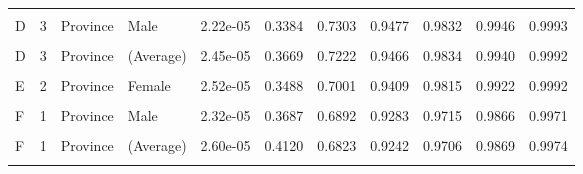 \documentclass[
]{report}
\begin{document}
\begin{table}[!h]
\begin{tabular}[t]{llllrrrrrrr}
\cellcolor{gray!6}{C} & \cellcolor{gray!6}{1} & \cellcolor{gray!6}{Age, province} & \cellcolor{gray!6}{(Average)} & \cellcolor{gray!6}{2.44e-05} & \cellcolor{gray!6}{0.3654} & \cellcolor{gray!6}{0.6575} & \cellcolor{gray!6}{0.9109} & \cellcolor{gray!6}{0.9646} & \cellcolor{gray!6}{0.9827} & \cellcolor{gray!6}{0.9959}\\
D & 3 & Province & Male & 2.22e-05 & 0.3384 & 0.7303 & 0.9477 & 0.9832 & 0.9946 & 0.9993\\
\addlinespace
\cellcolor{gray!6}{D} & \cellcolor{gray!6}{3} & \cellcolor{gray!6}{Province} & \cellcolor{gray!6}{Female} & \cellcolor{gray!6}{2.68e-05} & \cellcolor{gray!6}{0.3953} & \cellcolor{gray!6}{0.7140} & \cellcolor{gray!6}{0.9455} & \cellcolor{gray!6}{0.9837} & \cellcolor{gray!6}{0.9934} & \cellcolor{gray!6}{0.9990}\\
D & 3 & Province & (Average) & 2.45e-05 & 0.3669 & 0.7222 & 0.9466 & 0.9834 & 0.9940 & 0.9992\\
\cellcolor{gray!6}{E} & \cellcolor{gray!6}{2} & \cellcolor{gray!6}{Province} & \cellcolor{gray!6}{Male} & \cellcolor{gray!6}{2.25e-05} & \cellcolor{gray!6}{0.3479} & \cellcolor{gray!6}{0.7062} & \cellcolor{gray!6}{0.9410} & \cellcolor{gray!6}{0.9786} & \cellcolor{gray!6}{0.9922} & \cellcolor{gray!6}{0.9995}\\
E & 2 & Province & Female & 2.52e-05 & 0.3488 & 0.7001 & 0.9409 & 0.9815 & 0.9922 & 0.9992\\
\cellcolor{gray!6}{E} & \cellcolor{gray!6}{2} & \cellcolor{gray!6}{Province} & \cellcolor{gray!6}{(Average)} & \cellcolor{gray!6}{2.39e-05} & \cellcolor{gray!6}{0.3484} & \cellcolor{gray!6}{0.7031} & \cellcolor{gray!6}{0.9410} & \cellcolor{gray!6}{0.9800} & \cellcolor{gray!6}{0.9922} & \cellcolor{gray!6}{0.9993}\\
\addlinespace
F & 1 & Province & Male & 2.32e-05 & 0.3687 & 0.6892 & 0.9283 & 0.9715 & 0.9866 & 0.9971\\
\cellcolor{gray!6}{F} & \cellcolor{gray!6}{1} & \cellcolor{gray!6}{Province} & \cellcolor{gray!6}{Female} & \cellcolor{gray!6}{2.88e-05} & \cellcolor{gray!6}{0.4553} & \cellcolor{gray!6}{0.6754} & \cellcolor{gray!6}{0.9201} & \cellcolor{gray!6}{0.9698} & \cellcolor{gray!6}{0.9873} & \cellcolor{gray!6}{0.9976}\\
F & 1 & Province & (Average) & 2.60e-05 & 0.4120 & 0.6823 & 0.9242 & 0.9706 & 0.9869 & 0.9974\\
\cellcolor{gray!6}{G} & \cellcolor{gray!6}{None} & \cellcolor{gray!6}{N/A} & \cellcolor{gray!6}{Male} & \cellcolor{gray!6}{2.61e-05} & \cellcolor{gray!6}{0.4647} & \cellcolor{gray!6}{0.6112} & \cellcolor{gray!6}{0.8916} & \cellcolor{gray!6}{0.9545} & \cellcolor{gray!6}{0.9825} & \cellcolor{gray!6}{0.9952}\\

\end{tabular}
\end{table}
\end{document}
